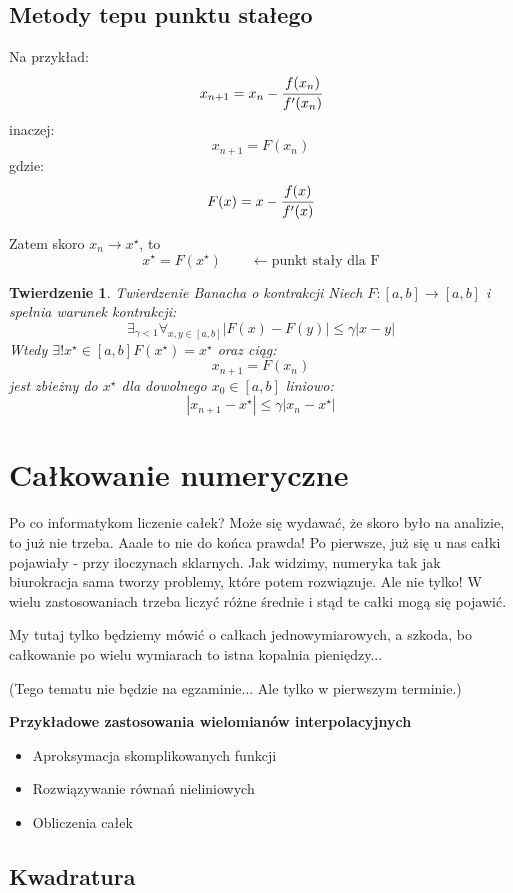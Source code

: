 \documentclass[hidelinks,a4paper,fleqn,oneside]{book}
\newcommand{\ra}{\rightarrow}
\newcommand{\la}{\leftarrow}
\newtheorem{twierdz}{Twierdzenie}
\begin{document}
\subsection{Metody tepu punktu stałego}

Na przykład:
\[
	x_{n+1} = x_n - \cfrac{f(x_n)}{f'(x_n)}
\]
inaczej:
\[
	x_{n+1} = F(x_n)
\]
gdzie:
\[
	F(x) = x - \cfrac{f(x)}{f'(x)}
\]

Zatem skoro $x_n \longrightarrow x^\star$, to
\[
	x^\star = F(x^\star)\quad \quad \la \textrm{punkt stały dla F}
\]
\begin{twierdz}{Twierdzenie Banacha o kontrakcji}
	Niech $F: [a, b] \ra [a, b]$ i spełnia warunek kontrakcji:
	\[
		\exists_{\gamma < 1} \forall_{x, y \in [a, b]} |F(x) - F(y)| \leq \gamma |x-y|
	\]
	Wtedy $\exists! x^\star \in [a, b] F(x^\star) = x^\star$
	oraz ciąg:
	\[
		x_{n+1} = F(x_n)
	\]
	jest zbieżny do $x^\star$ dla dowolnego $x_0 \in [a, b]$ liniowo:
	\[
		|x_{n+1} - x^\star| \leq \gamma|x_n - x^\star|
	\]
\end{twierdz}

\section{Całkowanie numeryczne}

Po co informatykom liczenie całek? Może się wydawać, że skoro było na analizie, to już nie trzeba. Aaale to nie do końca prawda! Po pierwsze, już się u nas całki pojawiały - przy iloczynach sklarnych. Jak widzimy, numeryka tak jak biurokracja sama tworzy problemy, które potem rozwiązuje. Ale nie tylko! W wielu zastosowaniach trzeba liczyć różne średnie i stąd te całki mogą się pojawić. 

My tutaj tylko będziemy mówić o całkach jednowymiarowych, a szkoda, bo całkowanie po wielu wymiarach to istna kopalnia pieniędzy...

(Tego tematu nie będzie na egzaminie... Ale tylko w pierwszym terminie.)

\textbf{Przykładowe zastosowania wielomianów interpolacyjnych}
\begin{itemize}
	\item Aproksymacja skomplikowanych funkcji
	\item Rozwiązywanie równań nieliniowych
	\item Obliczenia całek
\end{itemize}

\subsection*{Kwadratura}
\end{document}
